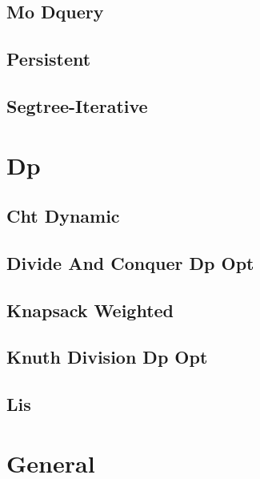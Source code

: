 \documentclass[10pt,portrait,twocolumn,a4paper,notitlepage]{article}
\newcommand\cppfile[2][]{%
\ifstrempty{#1}{}{}%
}
\begin{document}
\subsection{Mo Dquery}
\cppfile{data_structures_clean/Mo_DQuery.cpp}

\subsection{Persistent}
\cppfile{data_structures_clean/persistent.cpp}

\subsection{Segtree-Iterative}
\cppfile{data_structures_clean/segtree-iterative.cpp}


\section{Dp}

\subsection{Cht Dynamic}
\cppfile{dp_clean/CHT_Dynamic.cpp}

\subsection{Divide And Conquer Dp Opt}
\cppfile{dp_clean/divide_and_conquer_dp_opt.cpp}

\subsection{Knapsack Weighted}
\cppfile{dp_clean/Knapsack_weighted.cpp}

\subsection{Knuth Division Dp Opt}
\cppfile{dp_clean/knuth_division_dp_opt.cpp}

\subsection{Lis}
\cppfile{dp_clean/LIS.cpp}


\section{General}
\end{document}
